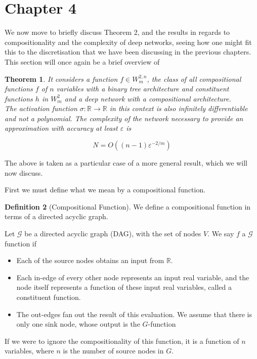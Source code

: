 \documentclass[11pt,a4paper]{article}
\theoremstyle{plain}
\newtheorem{theorem}{Theorem}[section]
\theoremstyle{definition}
\newtheorem{definition}[theorem]{Definition}
\theoremstyle{remark}
\begin{document}

\setcounter{section}{3} 
\section{Chapter 4}

We now move to briefly discuss Theorem 2, and the results in regards to compositionality and the complexity of deep networks, seeing how one might fit this to the discretisation that we have been discussing in the previous chapters.
This section will once again be a brief overview of \cite{Poggio}

\setcounter{theorem}{1} 
\begin{theorem}
    It considers a function \( f \in W_{m}^{2,n} \), the class of all compositional functions \(f\) of \(n\) variables with a binary tree architecture and constituent functions \(h\)  in \(W_{m}^{2}\)  and a deep network with a compositional architecture.\\
The activation function \( \sigma: \mathbb{R} \rightarrow \mathbb{R} \) in this context is also infinitely differentiable and not a polynomial. The complexity of the network necessary to provide an approximation with accuracy at least \( \varepsilon \) is 

\[ N = O((n - 1)\varepsilon^{-2/m}) \]
\end{theorem}

The above is taken as a particular case of a more general result, which we will now discuss. 

First we must define what we mean by a compositional function.

\begin{definition}[Compositional Function]
    We define  a compositional function in terms of a directed acyclic graph. 
    
    Let $\mathcal{G} $ be a directed acyclic graph (DAG), with the set of nodes $V$. We say \(f\) a \(\mathcal{G} \) function if
    \begin{itemize}
        \item Each of the source nodes obtains an input from $\mathbb{R}$.
        \item Each in-edge of every other node represents an input real variable, and the node itself represents a function of these input real variables, called a constituent function.
        \item The out-edges fan out the result of this evaluation. We assume that there is only one sink node, whose output is the $G$-function
    \end{itemize}
    If we were to ignore the compositionality of this function, it is a function of $n$ variables, where $n$ is the number of source nodes in $G$.
\end{definition}
\end{document}
